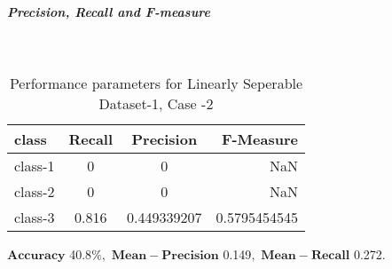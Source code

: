 \documentclass[a4paper]{article}
\begin{document}
\subparagraph{Precision, Recall and F-measure}\textcolor{white}{:}
\begin{table}[H]
  \begin{center}
    \caption{Performance parameters for Linearly Seperable Dataset-1, Case -2}
    \label{tab:table1}
    \begin{tabular}{l|c|c|r} %
      \textbf{class} & \textbf{Recall} & \textbf{Precision} & \textbf{F-Measure}\\
      \hline
      class-1 & 0 & 0 & NaN\\
      class-2 & 0 & 0 & NaN\\
      class-3 & 0.816 & 0.449339207 & 0.5795454545\\
    \end{tabular}
  \end{center}
\end{table}
$\mathbf{Accuracy}$ 40.8$\%,$ $\mathbf{Mean -Precision}$ 0.149$,$ $\mathbf{Mean- Recall}$ 0.272$.$
\end{document}
